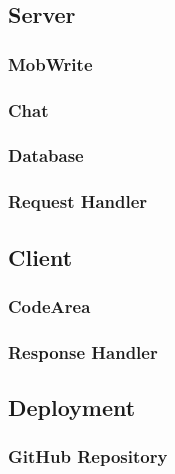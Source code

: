 \documentclass[twoside,letterpaper]{article}
\begin{document}
\newpage




\newpage
\subsection{Server}

\subsubsection{MobWrite}



\newpage
\subsubsection{Chat}




\newpage
\subsubsection{Database}




\newpage
\subsubsection{Request Handler}



\newpage
\subsection{Client}

\subsubsection{CodeArea}



\newpage
\subsubsection{Response Handler}


\newpage
\subsection{Deployment}

\subsubsection{GitHub Repository}
\end{document}
